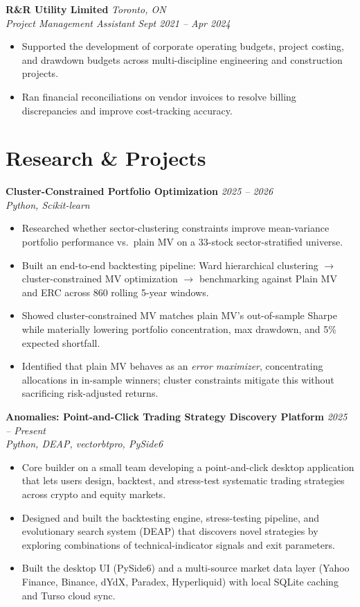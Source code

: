 \documentclass[11pt,letterpaper]{article}
\newcommand{\role}[4]{%
  \needspace{4\baselineskip}%
  \noindent\textbf{#1} \hfill \textit{#2} \\
  \textit{#3} \hfill \textit{#4} \\[-4pt]
}
\newcommand{\project}[3]{%
  \needspace{4\baselineskip}%
  \noindent\textbf{#1} \hfill \textit{#3} \\
  \textit{#2} \\[-4pt]
}
\begin{document}
\role{R\&R Utility Limited}{Toronto, ON}{Project Management Assistant}{Sept 2021 -- Apr 2024}
\begin{itemize}
  \item Supported the development of corporate operating budgets, project costing, and drawdown budgets across multi-discipline engineering and construction projects.
  \item Ran financial reconciliations on vendor invoices to resolve billing discrepancies and improve cost-tracking accuracy.
\end{itemize}

\section*{Research \& Projects}
\project{Cluster-Constrained Portfolio Optimization}{Python, Scikit-learn}{2025 -- 2026}
\begin{itemize}
  \item Researched whether sector-clustering constraints improve mean-variance portfolio performance vs.\ plain MV on a 33-stock sector-stratified universe.
  \item Built an end-to-end backtesting pipeline: Ward hierarchical clustering $\rightarrow$ cluster-constrained MV optimization $\rightarrow$ benchmarking against Plain MV and ERC across 860 rolling 5-year windows.
  \item Showed cluster-constrained MV matches plain MV's out-of-sample Sharpe while materially lowering portfolio concentration, max drawdown, and 5\% expected shortfall.
  \item Identified that plain MV behaves as an \emph{error maximizer}, concentrating allocations in in-sample winners; cluster constraints mitigate this without sacrificing risk-adjusted returns.
\end{itemize}

\project{Anomalies: Point-and-Click Trading Strategy Discovery Platform}{Python, DEAP, vectorbtpro, PySide6}{2025 -- Present}
\begin{itemize}
  \item Core builder on a small team developing a point-and-click desktop application that lets users design, backtest, and stress-test systematic trading strategies across crypto and equity markets.
  \item Designed and built the backtesting engine, stress-testing pipeline, and evolutionary search system (DEAP) that discovers novel strategies by exploring combinations of technical-indicator signals and exit parameters.
  \item Built the desktop UI (PySide6) and a multi-source market data layer (Yahoo Finance, Binance, dYdX, Paradex, Hyperliquid) with local SQLite caching and Turso cloud sync.
\end{itemize}
\end{document}

